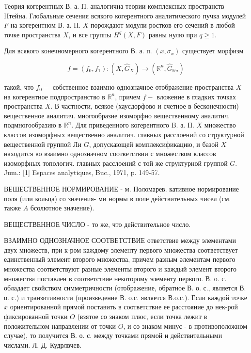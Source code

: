 \documentclass[10pt]{article}
\begin{document}
Теория когерентных В. а. П. аналогична теории комплексных пространств IIтейна. Глобальные сечения всякого когерентного аналитического пучка модулей $F$ на когерентном В. а. П. $X$ порождают модули ростков его сечений в любой точке пространства $X$, и все группы $H^{q}(X, F)$ равны нулю при $q \geqslant 1$.



Для всякого конечномерного когерентного В. а. п. $\left(x, \sigma_{x}\right)$ существует морфизм



\[

f=\left(f_{0}, f_{1}\right):\left(X, \hat{G}_{X}\right) \rightarrow\left(\mathbb{R}^{n}, \hat{G}_{\mathbb{R} n}\right)

\]



такой, что $f_{0}-$ собственное взаимно однозначное отображение пространства $X$ на когерентное подпространство в $\mathbb{R}^{n}$, причем $f-$ вложение в гладких точках пространства $X$. В частности, всякое (хаусдорфово и счетное в бесконечности) вещественное аналитич. многообразие изоморфно вещественному аналитич. подмногообразию в $\mathbb{R}^{n}$. Для приведенного когерентного B. а. П. $X$ множество классов изоморфных вещественно аналитич. главных расслоений со структурной вещественной группой Ли $G$, допускающей комплексификацию, и базой $X$ находится во взаимно однозначном соответствии с множеством классов изоморфных топологич. главных расслоений с той же структурной группой $G$. Jum.: [1] Espaces analytiques, Buc., 1971, p. 149-57.



ВЕШЕСТВЕННОЕ НОРМИРОВАНИЕ - м. Поломарев. кативное нормирование поля (или кольца) со значения- ми нормы в поле действительных чисел (см. также $A$ бсолютное значение).



ВЕЩЕСТВЕННОЕ ЧИСЛО - то же, что действительное число.



ВЗАИМНО ОДНОЗНАЧНОЕ СООТВЕТСТВИЕ ответствие между элементами двух множеств, при к-ром каждому элементу первого множества соответствует единственный элемент второго множества, причем разным әлементам первого множества соответствуют разные элементы второго и каждый элемент второго множества поставлен в соответствие некоторому элементу первого. В. о. с. обладает свойством симметричности (отображение, обратное В. о. с., является В. о. с.) и транзитивности (произведение В. о.с. является В.о.с.). Если каждой точке $x$ ориентированной прямой поставить в соответствие ее расстояние до нек-рой фиксированной точки $O$ (взятое со знаком плюс, если точка лежит в положительном направлении от точки $O$, и со знаком минус - в противоположном случае), то получится В. о. с. между точками прямой и действительными числами. Л. Д. Кудрлвчев.
\end{document}
